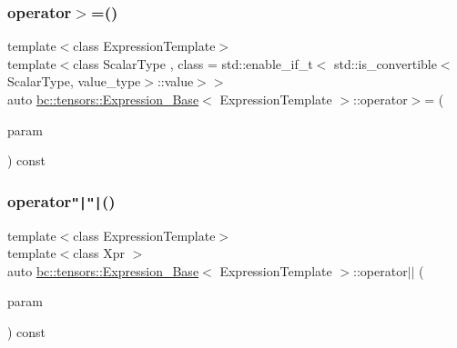 \subsubsection{\texorpdfstring{operator$>$=()}{operator>=()}\hspace{0.1cm}{\footnotesize\ttfamily [2/2]}}
{\footnotesize\ttfamily template$<$class Expression\+Template$>$ \\
template$<$class Scalar\+Type , class  = std\+::enable\+\_\+if\+\_\+t$<$   std\+::is\+\_\+convertible$<$\+Scalar\+Type, value\+\_\+type$>$\+::value$>$$>$ \\
auto \hyperlink{classbc_1_1tensors_1_1Expression__Base}{bc\+::tensors\+::\+Expression\+\_\+\+Base}$<$ Expression\+Template $>$\+::operator$>$= (\begin{DoxyParamCaption}\item[{const Scalar\+Type \&}]{param }\end{DoxyParamCaption}) const\hspace{0.3cm}{\ttfamily [inline]}}

\mbox{\label{classbc_1_1tensors_1_1Expression__Base_a336dc9c51a5a8a9a501b2c9ac23da203}} 
\subsubsection{\texorpdfstring{operator\texttt{"|}\texttt{"|}()}{operator||()}\hspace{0.1cm}{\footnotesize\ttfamily [1/2]}}
{\footnotesize\ttfamily template$<$class Expression\+Template$>$ \\
template$<$class Xpr $>$ \\
auto \hyperlink{classbc_1_1tensors_1_1Expression__Base}{bc\+::tensors\+::\+Expression\+\_\+\+Base}$<$ Expression\+Template $>$\+::operator$\vert$$\vert$ (\begin{DoxyParamCaption}\item[{const \hyperlink{classbc_1_1tensors_1_1Expression__Base}{Expression\+\_\+\+Base}$<$ Xpr $>$ \&}]{param }\end{DoxyParamCaption}) const\hspace{0.3cm}{\ttfamily [inline]}}

